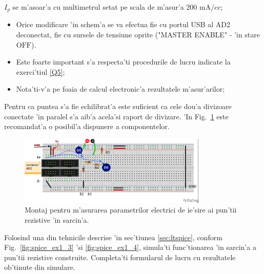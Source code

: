 \begin{observ}
$I_p$ se m'asoar'a cu multimetrul setat pe scala de m'asur'a 200 mA/cc;
\begin{itemize}
	\item 
		{\color{blue}
		Orice modificare 'in schem'a se va efectua fie cu portul USB al AD2 deconectat, fie cu sursele de tensiune oprite 
		("MASTER ENABLE" - 'in stare $\mathrm{OFF}$).}
\item {\color{blue} Este foarte important s'a respecta'ti procedurile de lucru indicate la exerci'tiul \ref{Q5}; }  
\item Nota'ti-v'a pe foaia de calcul electronic'a rezultatele m'asur'arilor;
\end{itemize}
\end{observ}
%
\begin{indicatie}
Pentru ca puntea s'a fie echilibrat'a este suficient ca cele dou'a divizoare conectate 'in paralel s'a aib'a acela'si raport de divizare.
'In Fig.~\ref{fig:4_punte_rez} este recomandat'a o posibil'a dispunere a componentelor.
\end{indicatie}
%
\begin{figure}
	\centering
		\includegraphics[width=0.8\textwidth]{laborator_01/figuri/4_punte_rez_bb}
	\caption{Montaj pentru m'asurarea parametrilor electrici de ie'sire ai pun'tii rezistive  'in sarcin'a.}
	\label{fig:4_punte_rez}
\end{figure}
%
%
\begin{exercise}  \label{Q10}
Folosind una din tehnicile descrise 'in sec'tiunea  \ref{sec:ltspice}, conform Fig.~\ref{fig:spice_ex1_3} 'si \ref{fig:spice_ex1_4}, simula'ti func'tionarea 'in sarcin'a a pun'tii rezistive construite. Completa'ti formularul de lucru cu rezultatele ob'tinute din simulare.
\end{exercise}
%
